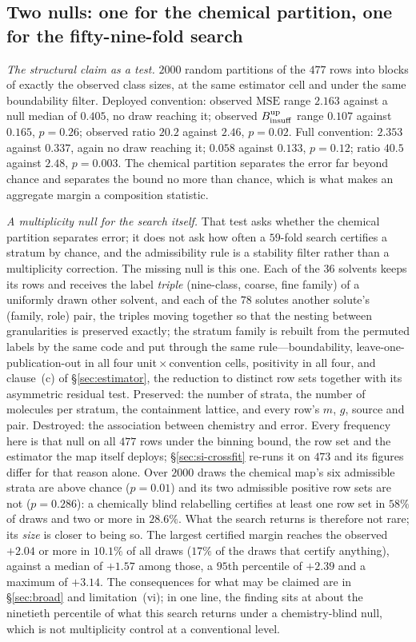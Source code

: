 \subsection{Two nulls: one for the chemical partition, one for the fifty-nine-fold search}
\label{sec:si-null}
\emph{The structural claim as a test.} $2000$ random partitions of the $477$ rows into blocks of
exactly the observed class sizes, at the same estimator cell and under the same boundability filter.
Deployed convention: observed $\mathrm{MSE}$ range $2.163$ against a null median of $0.405$, no draw
reaching it; observed $B_{\mathrm{insuff}}^{\mathrm{up}}$ range $0.107$ against $0.165$, $p=0.26$; observed ratio
$20.2$ against $2.46$, $p=0.02$. Full convention: $2.353$ against $0.337$, again no draw reaching it;
$0.058$ against $0.133$, $p=0.12$; ratio $40.5$ against $2.48$, $p=0.003$. The chemical partition
separates the error far beyond chance and separates the bound no more than chance, which is what
makes an aggregate margin a composition statistic.

\emph{A multiplicity null for the search itself.} That test asks whether the chemical partition
separates error; it does not ask how often a $59$-fold search certifies a stratum by chance, and
the admissibility rule is a stability filter rather than a multiplicity correction. The missing
null is this one. Each of the $36$ solvents keeps its rows and receives the label \emph{triple}
(nine-class, coarse, fine family) of a uniformly drawn other solvent, and each of the $78$ solutes
another solute's (family, role) pair, the triples moving together so that the nesting between
granularities is preserved exactly; the stratum family is rebuilt from the permuted labels by the
same code and put through the same rule---boundability, leave-one-publication-out in all four
unit\,$\times$\,convention cells, positivity in all four, and clause~(c) of \S\ref{sec:estimator},
the reduction to distinct row sets together with its asymmetric residual test.
Preserved: the number of strata, the number of molecules per stratum, the
containment lattice, and every row's $m$, $g$, source and pair. Destroyed: the association between
chemistry and error. Every frequency here is that null on all $477$ rows under the binning bound, the
row set and the estimator the map itself deploys; \S\ref{sec:si-crossfit} re-runs it on $473$ and
its figures differ for that reason alone. Over $2000$ draws the chemical map's six admissible
strata are above chance
($p=0.01$) and its two admissible positive row sets are not ($p=0.286$): a chemically blind
relabelling certifies at least one row set in $58\%$ of draws and two or more in $28.6\%$. What the
search returns is therefore not rare; its \emph{size} is closer to being so. The largest certified
margin reaches the observed $+2.04$ or more in $10.1\%$ of all draws ($17\%$ of the draws that
certify anything), against a median of $+1.57$ among those, a $95$th percentile of $+2.39$ and a
maximum of $+3.14$. The consequences for what may be claimed are in \S\ref{sec:broad} and
limitation~(vi); in one line, the finding sits at about the ninetieth percentile of what this
search returns under a chemistry-blind null, which is not multiplicity control at a conventional
level.

